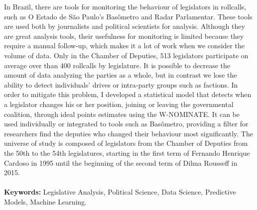 In Brazil, there are tools for monitoring the behaviour of legislators in
rollcalls, such as O Estado de São Paulo's Basômetro and Radar Parlamentar.
These tools are used both by journalists and political scientists for analysis.
Although they are great analysis tools, their usefulness for monitoring is
limited because they require a manual follow-up, which makes it a lot of work
when we consider the volume of data. Only in the Chamber of Deputies, 513
legislators participate on average over than 400 rollcalls by legislature. It
is possible to decrease the amount of data analyzing the parties as a whole,
but in contrast we lose the ability to detect individuals' drives or
intra-party groups such as factions.
In order to mitigate this problem, I developed a statistical model that detects
when a legislator changes his or her position, joining or leaving the
governmental coalition, through ideal points estimates using the W-NOMINATE. It
can be used individually or integrated to tools such as Basômetro, providing a
filter for researchers find the deputies who changed their behaviour most
significantly.
The universe of study is composed of legislators from the Chamber of Deputies
from the 50th to the 54th legislatures, starting in the first term of Fernando
Henrique Cardoso in 1995 until the beginning of the second term of Dilma
Rousseff in 2015.
\\
\\
\textbf{Keywords:} Legislative Analysis, Political Science, Data Science,
Predictive Models, Machine Learning.
